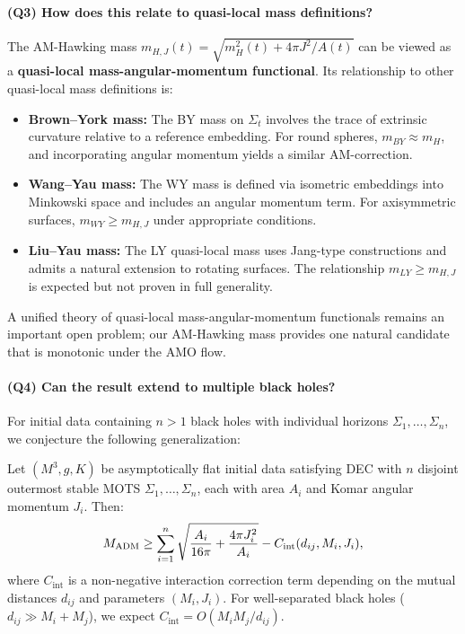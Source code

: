 \paragraph{(Q3) How does this relate to quasi-local mass definitions?}
The AM-Hawking mass $m_{H,J}(t) = \sqrt{m_H^2(t) + 4\pi J^2/A(t)}$ can be viewed as a \textbf{quasi-local mass-angular-momentum functional}. Its relationship to other quasi-local mass definitions is:
\begin{itemize}
    \item \textbf{Brown--York mass:} The BY mass on $\Sigma_t$ involves the trace of extrinsic curvature relative to a reference embedding. For round spheres, $m_{BY} \approx m_H$, and incorporating angular momentum yields a similar AM-correction.
    \item \textbf{Wang--Yau mass:} The WY mass is defined via isometric embeddings into Minkowski space and includes an angular momentum term. For axisymmetric surfaces, $m_{WY} \geq m_{H,J}$ under appropriate conditions.
    \item \textbf{Liu--Yau mass:} The LY quasi-local mass uses Jang-type constructions and admits a natural extension to rotating surfaces. The relationship $m_{LY} \geq m_{H,J}$ is expected but not proven in full generality.
\end{itemize}
A unified theory of quasi-local mass-angular-momentum functionals remains an important open problem; our AM-Hawking mass provides one natural candidate that is monotonic under the AMO flow.

\paragraph{(Q4) Can the result extend to multiple black holes?}
For initial data containing $n > 1$ black holes with individual horizons $\Sigma_1, \ldots, \Sigma_n$, we conjecture the following generalization:

\begin{conjecture}\label{conj:multi-horizon}
Let $(M^3, g, K)$ be asymptotically flat initial data satisfying DEC with $n$ disjoint outermost stable MOTS $\Sigma_1, \ldots, \Sigma_n$, each with area $A_i$ and Komar angular momentum $J_i$. Then:
\begin{equation}\label{eq:multi-horizon}
M_{\mathrm{ADM}} \geq \sum_{i=1}^n \sqrt{\frac{A_i}{16\pi} + \frac{4\pi J_i^2}{A_i}} - C_{\text{int}}(d_{ij}, M_i, J_i),
\end{equation}
where $C_{\text{int}}$ is a non-negative interaction correction term depending on the mutual distances $d_{ij}$ and parameters $(M_i, J_i)$. For well-separated black holes ($d_{ij} \gg M_i + M_j$), we expect $C_{\text{int}} = O(M_i M_j/d_{ij})$.
\end{conjecture}


